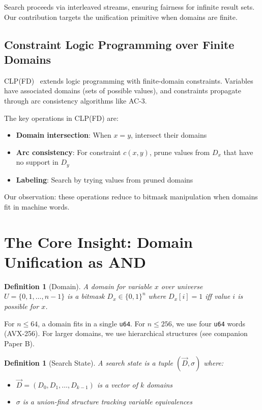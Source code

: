 \documentclass[11pt,a4paper]{article}
\newtheorem{definition}[theorem]{Definition}
\begin{document}
Search proceeds via interleaved streams, ensuring fairness for infinite result sets.
Our contribution targets the unification primitive when domains are finite.

\subsection{Constraint Logic Programming over Finite Domains}

CLP(FD)~\cite{clpfd_chirho} extends logic programming with finite-domain constraints.
Variables have associated domains (sets of possible values), and constraints propagate
through arc consistency algorithms like AC-3.

The key operations in CLP(FD) are:
\begin{itemize}
  \item \textbf{Domain intersection}: When $x = y$, intersect their domains
  \item \textbf{Arc consistency}: For constraint $c(x,y)$, prune values from $D_x$ that have no support in $D_y$
  \item \textbf{Labeling}: Search by trying values from pruned domains
\end{itemize}

Our observation: these operations reduce to bitmask manipulation when domains fit in machine words.

\section{The Core Insight: Domain Unification as AND}
\label{sec:core}

\begin{definition}[Domain]
A \emph{domain} for variable $x$ over universe $U = \{0, 1, \ldots, n-1\}$ is a bitmask $D_x \in \{0,1\}^n$ where $D_x[i] = 1$ iff value $i$ is possible for $x$.
\end{definition}

For $n \leq 64$, a domain fits in a single \texttt{u64}.
For $n \leq 256$, we use four \texttt{u64} words (AVX-256).
For larger domains, we use hierarchical structures (see companion Paper B).

\begin{definition}[Search State]
A \emph{search state} is a tuple $(\vec{D}, \sigma)$ where:
\begin{itemize}
  \item $\vec{D} = (D_0, D_1, \ldots, D_{k-1})$ is a vector of $k$ domains
  \item $\sigma$ is a union-find structure tracking variable equivalences
\end{itemize}
\end{definition}
\end{document}
